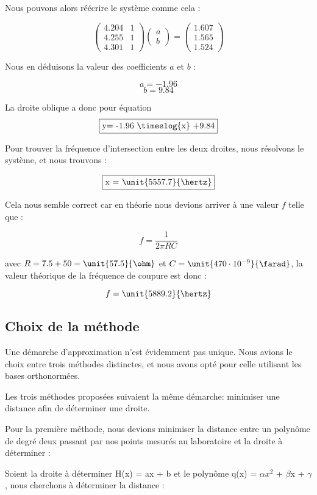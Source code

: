 Nous pouvons alors réécrire le système comme cela :

$$
\begin{pmatrix}
 4.204 & 1\\
 4.255 & 1 \\
 4.301 & 1
\end{pmatrix}
\begin{pmatrix}
a\\
b
\end{pmatrix}
=
\begin{pmatrix}
1.607\\
1.565\\
1.524
\end{pmatrix}
$$


Nous en déduisons la valeur des coefficients $a$ et $b$ :

$$a = -1.96$$
$$b= 9.84$$

La droite oblique a donc pour équation
$$\fbox{y= -1.96 \timeslog{x} +9.84}$$

Pour trouver la fréquence d'intersection entre les deux droites, nous résolvons le système, et nous
trouvons :

$$\fbox{x = \unit{5557.7}{\hertz}}$$

Cela nous semble correct car en théorie nous devions arriver à une valeur $f$ telle que :

$$f=\frac{1}{2\pi RC}$$

avec $R= 7.5 + 50 = \unit{57.5}{\ohm}$ et $C= \unit{470 \cdot 10^{-9}}{\farad}$, la valeur théorique de
la fréquence de coupure est donc :

$$f= \unit{5889.2}{\hertz}$$


\subsection{Choix de la méthode}

Une démarche d'approximation n'est évidemment pas unique. Nous avions le choix entre trois méthodes
distinctes, et nous avons opté pour celle utilisant les bases orthonormées.

Les trois méthodes proposées suivaient la même démarche: minimiser une distance afin de déterminer une droite. 

Pour la première méthode,  nous devions minimiser la distance entre un polynôme de degré deux passant par nos
points mesurés au laboratoire et la droite à déterminer :

Soient la droite à déterminer H(x) = ax + b et le polynôme q(x) = $\alpha x^2$ + $\beta$x + $\gamma$, nous
cherchons à déterminer la distance :

